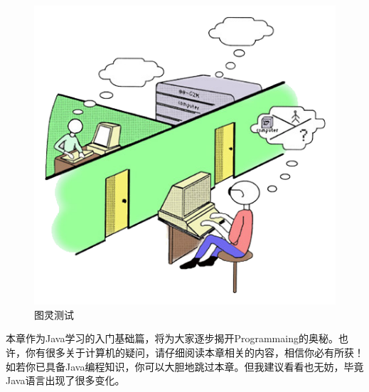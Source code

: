 \begin{figure}[!htb]
\centerline{\includegraphics[width=.3\figwidth]{images/turingtest.png}}
\caption{图灵测试}
\label{fig:part1_turning_test}
\end{figure}

本章作为Java学习的入门基础篇，将为大家逐步揭开Programmaing的奥秘。也许，你有很多关于计算机的疑问，请仔细阅读本章相关的内容，相信你必有所获！如若你已具备Java编程知识，你可以大胆地跳过本章。但我建议看看也无妨，毕竟Java语言出现了很多变化。